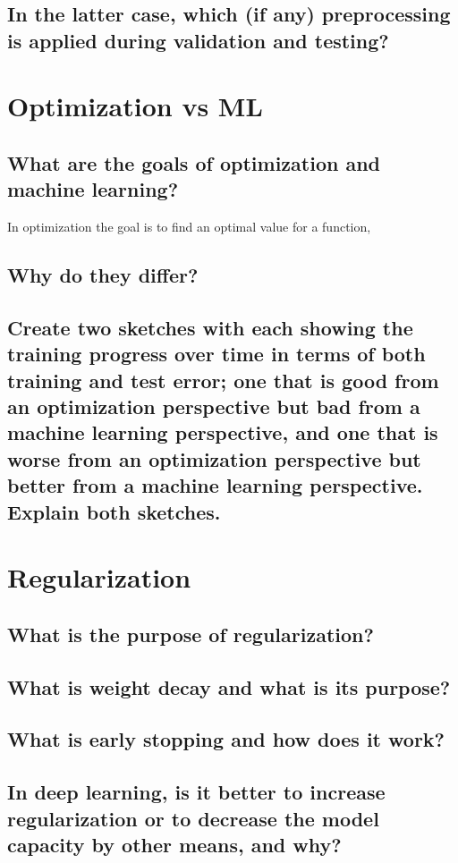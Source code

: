 \subsection{In the latter case, which (if any) preprocessing is applied during validation and testing?}

\section{Optimization vs ML}
\subsection{What are the goals of optimization and machine learning?}
In optimization the goal is to find an optimal value for a function, 
\subsection{Why do they differ?}
\subsection{Create two sketches with each showing the training progress over time in terms of both training and test error; one that is good from an optimization perspective but bad from a machine learning perspective, and one that is worse from an optimization perspective but better from a machine learning perspective. Explain both sketches.}

\section{Regularization}
\subsection{What is the purpose of regularization?}
\subsection{What is weight decay and what is its purpose?}
\subsection{What is early stopping and how does it work?}
\subsection{In deep learning, is it better to increase regularization or to decrease the model capacity by other means, and why?}

